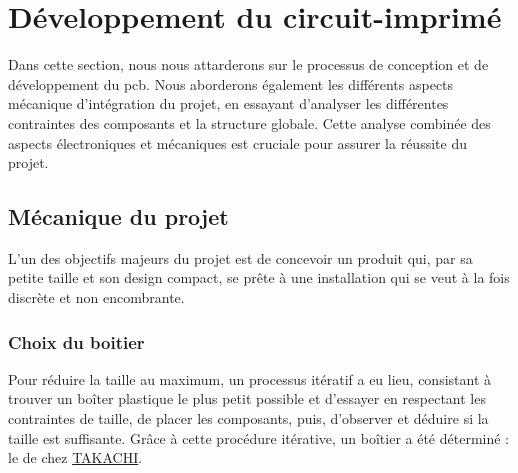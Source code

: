 \newpage
\section{Développement du circuit-imprimé} \label{sec:Dev-PCB}
Dans cette section, nous nous attarderons sur le processus de conception et de développement du \gls{pcb}. Nous aborderons également les différents aspects mécanique d'intégration du projet, en essayant d'analyser les différentes contraintes des composants et la structure globale. Cette analyse combinée des aspects électroniques et mécaniques est cruciale pour assurer la réussite du projet.

\clearpage

\subsection{Mécanique du projet} \label{ssec:mechProjet}
L'un des objectifs majeurs du projet est de concevoir un produit qui, par sa petite taille et son design compact, se prête à une installation qui se veut à la fois discrète et non encombrante.
 
\subsubsection{Choix du boitier}
Pour réduire la taille au maximum, un processus itératif a eu lieu, consistant à trouver un boîter plastique le plus petit possible et d'essayer en respectant les contraintes de taille, de placer les composants, puis, d'observer et déduire si la taille est suffisante. Grâce à cette procédure itérative, un boîtier a été déterminé : le  de chez \href{https://www.takachi-enclosure.com/products/SIC}{TAKACHI}.

